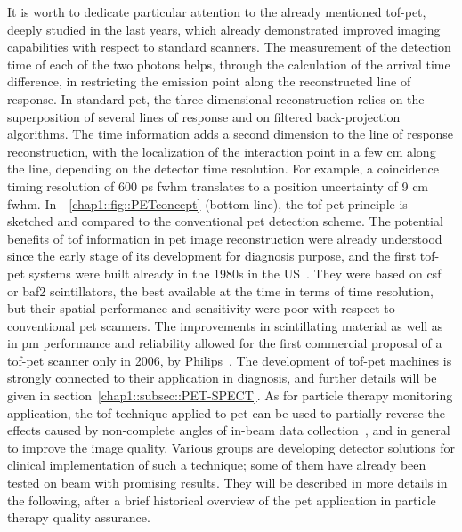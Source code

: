 It is worth to dedicate particular attention to the already mentioned \gls{tof}-\gls{pet}, deeply studied in the last years, which already demonstrated improved imaging capabilities with respect to standard scanners. The measurement of the detection time of each of the two photons helps, through the calculation of the arrival time difference, in restricting the emission point along the reconstructed line of response. In standard \gls{pet}, the three-dimensional reconstruction relies on the superposition of several lines of response and on filtered back-projection algorithms. The time information adds a second dimension to the line of response reconstruction, with the localization of the interaction point in a few cm along the line, depending on the detector time resolution. For example, a coincidence timing resolution of 600 ps \gls{fwhm} translates to a position uncertainty of 9 cm \gls{fwhm}. In~\figurename~\ref{chap1::fig::PETconcept} (bottom line), the \gls{tof}-\gls{pet} principle is sketched and compared to the conventional \gls{pet} detection scheme. 
The potential benefits of \gls{tof} information in \gls{pet} image reconstruction were already understood since the early stage of its development for diagnosis purpose, and the first \gls{tof}-\gls{pet} systems were built already in the 1980s in the US~\parencite{Gariod1982}. They were based on \gls{csf} or \gls{baf2} scintillators, the best available at the time in terms of time resolution, but their spatial performance and sensitivity were poor with respect to conventional \gls{pet} scanners. The improvements in scintillating material as well as in \gls{pm} performance and reliability allowed for the first commercial proposal of a \gls{tof}-\gls{pet} scanner only in 2006, by Philips~\parencite{Surti2007}. The development of \gls{tof}-\gls{pet} machines is strongly connected to their application in diagnosis, and further details will be given in section~\ref{chap1::subsec::PET-SPECT}. As for particle therapy monitoring application, the \gls{tof} technique applied to \gls{pet} can be used to partially reverse the effects caused by non-complete angles of in-beam data collection~\parencite{Crespo2006}, and in general to improve the image quality. Various groups are developing detector solutions for clinical implementation of such a technique; some of them have already been tested on beam with promising results. They will be described in more details in the following, after a brief historical overview of the \gls{pet} application in particle therapy quality assurance. 

